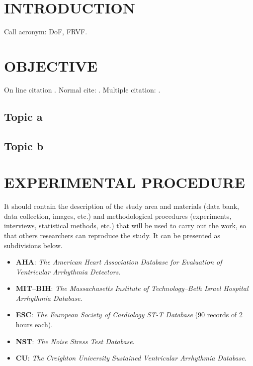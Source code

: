 \chapter{INTRODUCTION}
\label{chap:introduction}

Call acronym: \ac{DoF}, \ac{FRVF}.

\lipsum[1-2]

\chapter{OBJECTIVE}
\label{chap:objetive}

On line citation .
Normal cite: \cite{earnshaw2014virtual}. Multiple citation: \cite{azuma1997survey, earnshaw2014virtual}.

\section{Topic a}

\lipsum[1]

\section{Topic b}

\lipsum[1]

\chapter{EXPERIMENTAL PROCEDURE} 
\label{chap:methodology}

It should contain the description of the study area and materials (data bank, data collection, images, etc.) and methodological procedures (experiments, interviews, statistical methods, etc.) that will be used to carry out the work, so that others researchers can reproduce the study. It can be presented as subdivisions below.

\begin{itemize}
	\item \large \textbf{AHA}: \large \textit{The American Heart Association Database for Evaluation of Ventricular Arrhythmia Detectors}.
	\item \large \textbf{MIT–BIH}: \large \textit{The Massachusetts Institute of Technology–Beth Israel Hospital Arrhythmia Database}.
	\item \large \textbf{ESC}: \large \textit{The European Society of Cardiology ST-T Database} (90 records of 2 hours each).
	\item \large \textbf{NST}: \large \textit{The Noise Stress Test Database}.
	\item \large \textbf{CU}: \large \textit{The Creighton University Sustained Ventricular Arrhythmia Database}.
\end{itemize}

